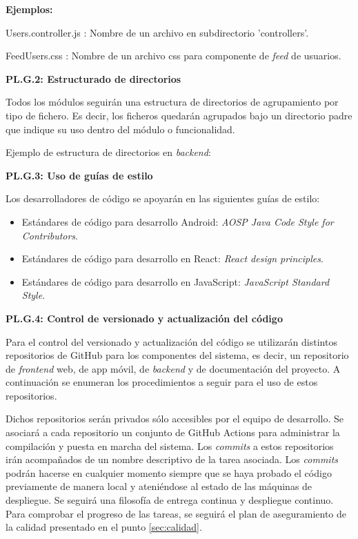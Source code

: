 \documentclass{article}
\begin{document}
\textbf{Ejemplos:}
 
Users.controller.js : Nombre de un archivo en subdirectorio 'controllers'.
 
FeedUsers.css :  Nombre de un archivo css para componente de \textit{feed} de usuarios.
 
\pagebreak
\textbf{PL.G.2: Estructurado de directorios}
 
Todos los módulos seguirán una estructura de directorios de agrupamiento por tipo de fichero. Es decir, los ficheros quedarán agrupados bajo un directorio padre que indique su uso dentro del módulo o funcionalidad.
 
Ejemplo de estructura de directorios en \textit{backend}:
 
 
\textbf{PL.G.3: Uso de guías de estilo}
 
Los desarrolladores de código se apoyarán en las siguientes guías de estilo:
 
\begin{itemize}
   \setlength{\itemsep}{0em}
   \item Estándares de código para desarrollo Android: \textit{AOSP Java Code Style for Contributors}.
   \item Estándares de código para desarrollo en React: \textit{React design principles}.
   \item Estándares de código para desarrollo en JavaScript: \textit{JavaScript Standard Style}.
\end{itemize}
 
\textbf{PL.G.4: Control de versionado y actualización del código}
 
Para el control del versionado y actualización del código se utilizarán distintos repositorios de GitHub para los componentes del sistema, es decir, un repositorio de \textit{frontend} web, de app móvil, de \textit{backend} y de documentación del proyecto. A continuación se enumeran los procedimientos a seguir para el uso de estos repositorios.
 
Dichos repositorios serán privados sólo accesibles por el equipo de desarrollo. Se asociará a cada repositorio un conjunto de GitHub Actions para administrar la compilación y puesta en marcha del sistema. Los \textit{commits} a estos repositorios irán acompañados de un nombre descriptivo de la tarea asociada. Los \textit{commits} podrán hacerse en cualquier momento siempre que se haya probado el código previamente de manera local y ateniéndose al estado de las máquinas de despliegue. Se seguirá una filosofía de entrega continua y despliegue continuo. Para comprobar el progreso de las tareas, se seguirá el plan de aseguramiento de la calidad presentado en el punto \ref{sec:calidad}.
 
\end{document}
